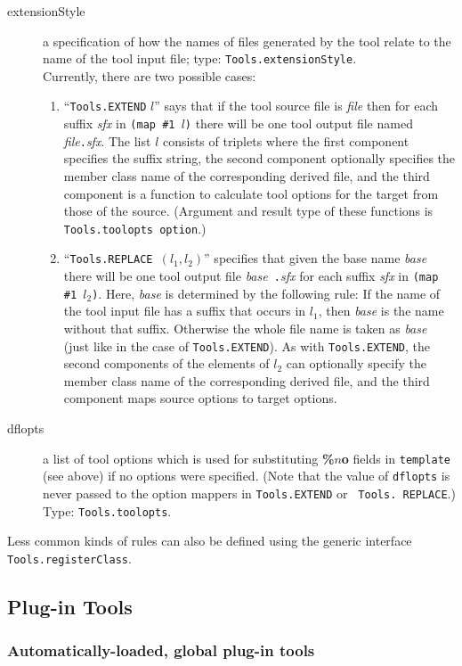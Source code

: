 \documentclass[titlepage,letterpaper]{article}
\begin{document}
\begin{description}
\item[extensionStyle] a specification of how the names of files
generated by the tool relate to the name of the tool input file;
type: {\tt Tools.extensionStyle}. \\
Currently, there are two possible cases:
\begin{enumerate}
\item ``{\tt Tools.EXTEND} $l$'' says that if the tool source file is
{\it file} then for each suffix {\it sfx} in {\tt (map \#1 $l$)} there
will be one tool output file named {\it file}{\tt .}{\it sfx}.  The
list $l$ consists of triplets where the first component specifies the
suffix string, the second component optionally specifies the
member class name of the corresponding derived file, and the
third component is a function to calculate tool options for the 
target from those of the source. (Argument and result type of these
functions is {\tt Tools.toolopts option}.)
\item ``{\tt Tools.REPLACE }$(l_1, l_2)$'' specifies that given the
base name {\it base} there will be one tool output file {\it base}{\tt
.}{\it sfx} for each suffix {\it sfx} in {\tt (map \#1 $l_2$)}.  Here,
{\it base} is determined by the following rule: If the name of the
tool input file has a suffix that occurs in $l_1$, then {\it base} is
the name without that suffix.  Otherwise the whole file name is taken
as {\it base} (just like in the case of {\tt Tools.EXTEND}).  As with
{\tt Tools.EXTEND}, the second components of the elements of $l_2$ can
optionally specify the member class name of the corresponding derived
file, and the third component maps source options to target options.
\end{enumerate}
\item[dflopts] a list of tool options which is used for
substituting {\bf \%$n$o} fields in {\tt template} (see above) if no
options were specified.  (Note that the value of {\tt dflopts} is never
passed to the option mappers in {\tt Tools.EXTEND} or {\tt
Tools. REPLACE}.)  Type: {\tt Tools.toolopts}.
\end{description}

Less common kinds of rules can also be defined using the generic
interface {\tt Tools.registerClass}.

\subsection{Plug-in Tools}
\label{sec:plugintools}

\subsubsection{Automatically-loaded, global plug-in tools}
\end{document}
